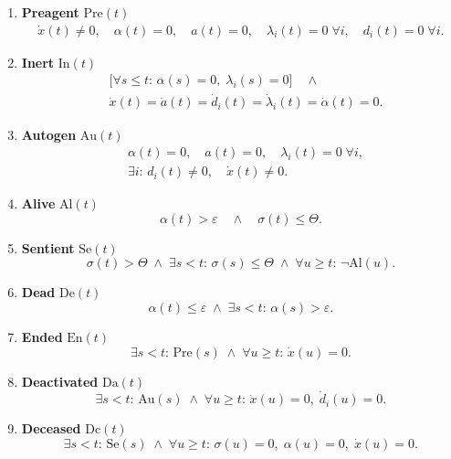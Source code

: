 \documentclass[
]{article}
\begin{document}
\begin{enumerate}
\def\labelenumi{\arabic{enumi}.}
\item
  \textbf{Preagent} \(\mathrm{Pre}(t)\)\\
  \[
  \begin{aligned}
  \dot x(t)\neq0,\quad
  \alpha(t)=0,\quad
  a(t)=0,\quad
  \lambda_i(t)=0\;\forall i,\quad
  d_i(t)=0\;\forall i.
  \end{aligned}
  \]
\item
  \textbf{Inert} \(\mathrm{In}(t)\)\\
  \[
  \begin{aligned}
  &\bigl[\forall s\le t:\,\alpha(s)=0,\;\lambda_i(s)=0\bigr]\quad\land\\
  &\dot x(t)=\dot a(t)=\dot d_i(t)=\dot\lambda_i(t)=\dot\alpha(t)=0.
  \end{aligned}
  \]
\item
  \textbf{Autogen} \(\mathrm{Au}(t)\)\\
  \[
  \begin{aligned}
  &\alpha(t)=0,\quad a(t)=0,\quad \lambda_i(t)=0\;\forall i,\\
  &\exists i:\,d_i(t)\neq0,\quad \dot x(t)\neq0.
  \end{aligned}
  \]
\item
  \textbf{Alive} \(\mathrm{Al}(t)\)\\
  \[
  \alpha(t)>\varepsilon
  \quad\land\quad
  \sigma(t)\le\Theta.
  \]
\item
  \textbf{Sentient} \(\mathrm{Se}(t)\)\\
  \[
  \sigma(t)>\Theta
  \;\land\;
  \exists s<t:\,\sigma(s)\le\Theta
  \;\land\;
  \forall u\ge t:\,\neg\mathrm{Al}(u).
  \]
\item
  \textbf{Dead} \(\mathrm{De}(t)\)\\
  \[
  \alpha(t)\le\varepsilon
  \;\land\;
  \exists s<t:\,\alpha(s)>\varepsilon.
  \]
\item
  \textbf{Ended} \(\mathrm{En}(t)\)\\
  \[
  \exists s<t:\,\mathrm{Pre}(s)
  \;\land\;
  \forall u\ge t:\,\dot x(u)=0.
  \]
\item
  \textbf{Deactivated} \(\mathrm{Da}(t)\)\\
  \[
  \exists s<t:\,\mathrm{Au}(s)
  \;\land\;
  \forall u\ge t:\,\dot x(u)=0,\;\dot d_i(u)=0.
  \]
\item
  \textbf{Deceased} \(\mathrm{Dc}(t)\)\\
  \[
  \exists s<t:\,\mathrm{Se}(s)
  \;\land\;
  \forall u\ge t:\,\sigma(u)=0,\;\alpha(u)=0,\;\dot x(u)=0.
  \]
\end{enumerate}
\end{document}
